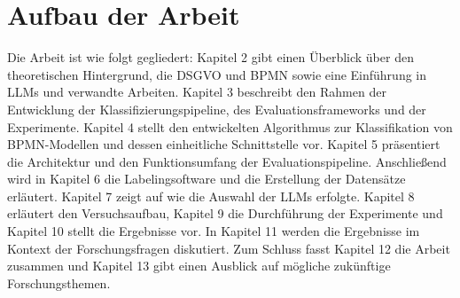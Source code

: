 \section{Aufbau der Arbeit}\label{sec:aufbau-der-arbeit}

Die Arbeit ist wie folgt gegliedert: Kapitel 2 gibt einen Überblick über den theoretischen Hintergrund, die \ac{DSGVO} und \ac{BPMN} sowie eine Einführung in \acp{LLM} und verwandte Arbeiten. Kapitel 3 beschreibt den Rahmen der Entwicklung der Klassifizierungspipeline, des Evaluationsframeworks und der Experimente. Kapitel 4 stellt den entwickelten Algorithmus zur Klassifikation von \ac{BPMN}-Modellen und dessen einheitliche Schnittstelle vor. Kapitel 5 präsentiert die Architektur und den Funktionsumfang der Evaluationspipeline. Anschließend wird in Kapitel 6 die Labelingsoftware und die Erstellung der Datensätze erläutert. Kapitel 7 zeigt auf wie die Auswahl der \acp{LLM} erfolgte. Kapitel 8 erläutert den Versuchsaufbau, Kapitel 9 die Durchführung der Experimente und Kapitel 10 stellt die Ergebnisse vor. In Kapitel 11 werden die Ergebnisse im Kontext der Forschungsfragen diskutiert. Zum Schluss fasst Kapitel 12 die Arbeit zusammen und Kapitel 13 gibt einen Ausblick auf mögliche zukünftige Forschungsthemen.